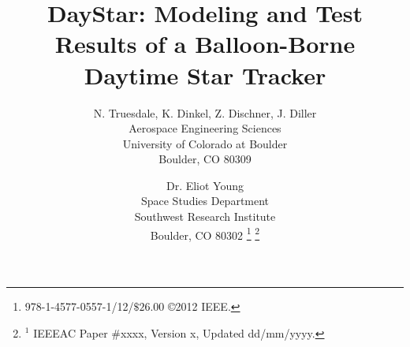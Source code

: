 \documentclass[twocolumn,letterpaper]{IEEEAerospace2012}
\begin{document}
\title{DayStar: Modeling and Test Results of a Balloon-Borne Daytime Star Tracker}

\author{%
    N. Truesdale, K. Dinkel, Z. Dischner, J. Diller \\
    Aerospace Engineering Sciences\\
    University of Colorado at Boulder\\
    Boulder, CO 80309\\
    \and 
    Dr. Eliot Young\\
    Space Studies Department\\
    Southwest Research Institute\\
    Boulder, CO 80302
    \thanks{\footnotesize 978-1-4577-0557-1/12/$\$26.00$ \copyright2012 IEEE.}              %
    \thanks{$^1$ IEEEAC Paper \#xxxx, Version x, Updated dd/mm/yyyy.} %
}


\maketitle
\end{document}
